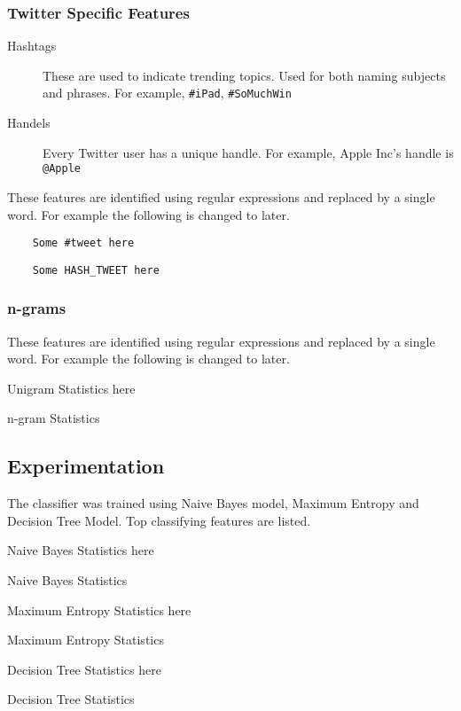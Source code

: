 \subsubsection{Twitter Specific Features}
	\begin{description}
	\item[Hashtags]{These are used to indicate trending topics. Used for both naming subjects and phrases. For example, \verb+#iPad+, \verb+#SoMuchWin+}
	\item[Handels]{Every Twitter user has a unique handle. For example, Apple Inc's handle is \verb+@Apple+}
	\end{description}
These features are identified using regular expressions and replaced by a single word.
For example the following is changed to later.
\begin{verbatim}
	Some #tweet here
\end{verbatim}
\begin{verbatim}
	Some HASH_TWEET here
\end{verbatim}

\subsubsection{n-grams}
These features are identified using regular expressions and replaced by a single word.
For example the following is changed to later.

\begin{table}[h]
\centering
Unigram Statistics here
\caption{n-gram Statistics}
\label{ngram}
\end{table}

\subsection{Experimentation}
The classifier was trained using Naive Bayes model, Maximum Entropy and Decision Tree Model.
Top classifying features are listed.

\begin{table}[h]
\centering
Naive Bayes Statistics here
\caption{Naive Bayes Statistics}
\label{naive}
\end{table}

\begin{table}[h]
\centering
Maximum Entropy Statistics here
\caption{Maximum Entropy Statistics}
\label{maxent}
\end{table}

\begin{table}[h]
\centering
Decision Tree Statistics here
\caption{Decision Tree Statistics}
\label{dtree}
\end{table}


